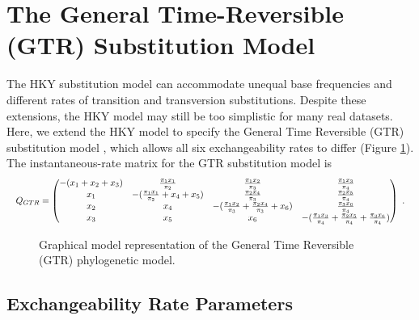 \newpage
\section{The General Time-Reversible (GTR) Substitution Model}

The HKY substitution model can accommodate unequal base frequencies and different rates of transition and transversion substitutions.
Despite these extensions, the HKY model may still be too simplistic for many real datasets.
Here, we extend the HKY model to specify the General Time Reversible (GTR) substitution model \citep{Tavare1986}, which allows all six exchangeability rates to differ (Figure \ref{fig:gtr}).
The instantaneous-rate matrix for the GTR substitution model is
\begin{equation*}
\resizebox{\textwidth}{!}{%
$Q_{GTR} = \begin{pmatrix}
{-(x_1 + x_2 + x_3)} & {\pi_1 x_1 \over \pi_2} & {\pi_1 x_2 \over \pi_3} & {\pi_1 x_3 \over \pi_4} \\ 
{x_1} & {-({\pi_1 x_1 \over \pi_2} + x_4 + x_5)} & {\pi_2 x_4 \over \pi_3} & {\pi_2 x_5 \over \pi_4} \\ 
{x_2} & {x_4} & {-({\pi_1 x_2 \over \pi_3} + {\pi_2 x_4 \over \pi_3} + x_6)} & {\pi_3 x_6 \over \pi_4} \\  
{x_3} & {x_5} & {x_6} & {-({\pi_1 x_3 \over \pi_4} + {\pi_2 x_5 \over \pi_4} + {\pi_3 x_6 \over \pi_4})} 
\end{pmatrix} \mbox{  .} $}
\end{equation*}

\begin{figure}[h!]
\centering
{}
\caption{\small Graphical model representation of the General Time Reversible (GTR) phylogenetic model.}
\label{fig:gtr}
\end{figure}


\subsection{Exchangeability Rate Parameters}

